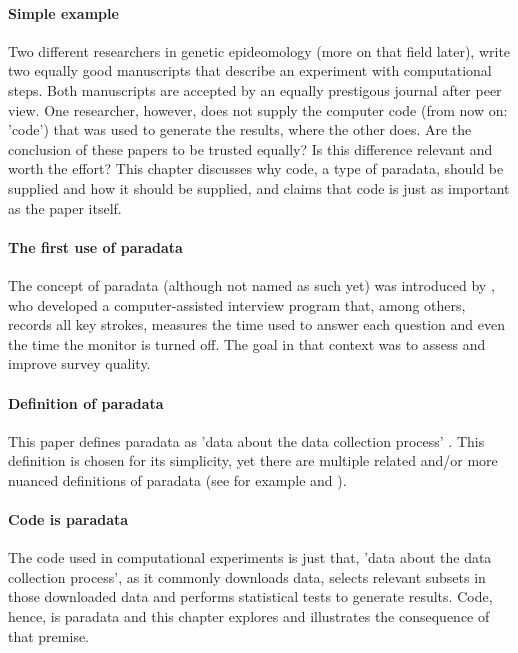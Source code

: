 \paragraph{Simple example}

Two different researchers in genetic epideomology (more on that field later), 
write two equally good manuscripts
that describe an experiment with computational steps.
Both manuscripts are accepted by an equally prestigous journal after peer view. 
One researcher, however, does not supply the
computer code (from now on: 'code') that was used to generate the results,
where the other does.
Are the conclusion of these papers to be trusted equally?
Is this difference relevant and worth the effort?
This chapter discusses why code, a type of paradata, 
should be supplied
and how it should be supplied,
and claims that code is just as important as the paper itself.

\paragraph{The first use of paradata}

The concept of paradata (although not named as such yet) 
was introduced by \cite{couper1998measuring},
who developed a computer-assisted interview program
that, among others, records all key strokes,
measures the time used to answer each question 
and even the time the monitor is turned off.
The goal in that context was to assess and improve survey quality.

\paragraph{Definition of paradata}

This paper defines paradata as 'data about the data collection 
process' \cite{choumert2019using}.
This definition is chosen for its simplicity, 
yet there are multiple related and/or more nuanced 
definitions of paradata (see for example \cite{huvila2022improving} 
and \cite{skold2022interrogating}).

\paragraph{Code is paradata}

The code used in computational experiments is just that, 
'data about the data collection 
process', as it commonly downloads data, selects relevant subsets in those
downloaded data and performs statistical tests to generate results.
Code, hence, is paradata and this chapter explores and illustrates the
consequence of that premise.

